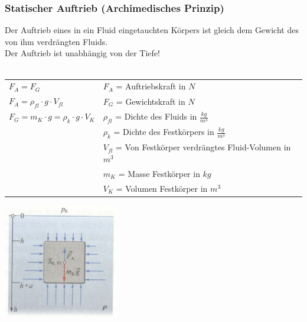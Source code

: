 	\subsubsection{Statischer Auftrieb (Archimedisches Prinzip)}
		\begin{minipage}[t]{13cm}
			Der Auftrieb eines in ein Fluid eingetauchten Körpers ist gleich dem Gewicht des von ihm verdrängten Fluids.\\
			Der Auftrieb ist unabhängig von der Tiefe!\\ \\
			\renewcommand{\arraystretch}{1.5}
			\begin{tabular}{ p{4cm} p{7cm}}
				$F_A = F_G$	&	$F_A$ = Auftriebskraft in $N$\\
				$F_A = \rho_{fl} \cdot g \cdot V_{fl}$	& $F_G$ = Gewichtskraft in $N$\\
				$F_G = m_K \cdot g = \rho_k \cdot g \cdot V_K$	& $\rho_{fl}$ = Dichte des Fluids in $\frac{kg}{m^3}$\\
				& $\rho_{k}$ = Dichte des Festkörpers in $\frac{kg}{m^3}$\\
				& $V_{fl}$ = Von Festkörper verdrängtes Fluid-Volumen in $m^3$\\
				& $m_K$ = Masse Festkörper in $kg$\\
				& $V_K$ = Volumen Festkörper in $m^3$\\
			\end{tabular}
			\renewcommand{\arraystretch}{1}
		\end{minipage}
		\begin{minipage}[t]{10cm}
			\vspace{-\ht\strutbox}\includegraphics[width=5cm]{./bilder/StatischerAuftrieb.jpg}
		\end{minipage}
	
